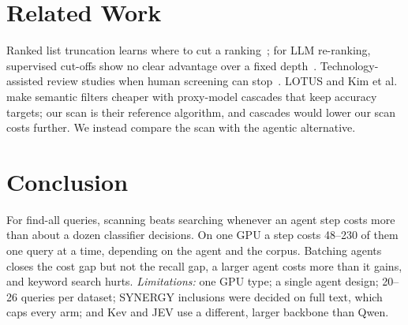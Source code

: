 \documentclass[sigconf,nonacm]{acmart}
\begin{document}
\section{Related Work}

Ranked list truncation learns where to cut a ranking~\cite{bahri2020choppy,
wu2021attncut}; for LLM re-ranking, supervised cut-offs show no clear advantage
over a fixed depth~\cite{meng2024rlt}. Technology-assisted review studies when
human screening can stop~\cite{cormack2016tar,yang2021stopping}. LOTUS
\cite{patel2024lotus} and Kim et al.~\cite{kim2026semfilter} make semantic
filters cheaper with proxy-model cascades that keep accuracy targets; our scan
is their reference algorithm, and cascades would lower our scan costs further.
We instead compare the scan with the agentic alternative.

\section{Conclusion}

For find-all queries, scanning beats searching whenever an agent step costs more
than about a dozen classifier decisions. On one GPU a step costs 48--230 of them
one query at a time, depending on the agent and the corpus. Batching agents closes the cost gap but not the
recall gap, a larger agent costs more than it gains, and keyword search hurts.
\emph{Limitations:} one GPU type; a single agent design; 20--26 queries per
dataset; SYNERGY inclusions were decided on full text, which caps every arm;
and Kev and JEV use a different, larger backbone than Qwen.



\end{document}
